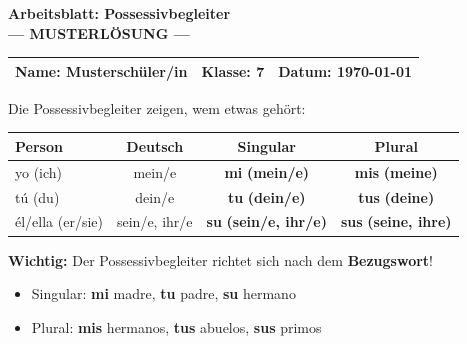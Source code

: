 \documentclass[11pt, a4paper]{article}
\newcommand{\fachfarbe}{spanisch}
\newcommand{\thema}{Possessivbegleiter}
\newcommand{\klasse}{7}
\newcommand{\datum}{\today}
\newcommand{\lsg}[1]{\textcolor{loesung}{\textbf{#1}}}
\newcommand{\es}[1]{\textcolor{\fachfarbe}{\textbf{#1}}}
\begin{document}

\begin{center}
    {\Large\bfseries\textcolor{\fachfarbe}{Arbeitsblatt: \thema}}\\[0.3em]
    {\large\textcolor{loesung}{\textbf{--- MUSTERLÖSUNG ---}}}
\end{center}

\vspace{5pt}

\noindent
\begin{tabularx}{\textwidth}{|X|X|X|}
\hline
\textbf{Name:} \lsg{Musterschüler/in} &
\textbf{Klasse:} \klasse &
\textbf{Datum:} \datum \\
\hline
\end{tabularx}

\vspace{15pt}


\begin{merkkasten}
Die Possessivbegleiter zeigen, wem etwas gehört:

\vspace{0.5em}

\begin{center}
\begin{tabular}{|l|c|c|c|}
\hline
\textbf{Person} & \textbf{Deutsch} & \textbf{Singular} & \textbf{Plural} \\
\hline
yo (ich) & mein/e & \es{mi} \lsg{(mein/e)} & \es{mis} \lsg{(meine)} \\
\hline
tú (du) & dein/e & \es{tu} \lsg{(dein/e)} & \es{tus} \lsg{(deine)} \\
\hline
él/ella (er/sie) & sein/e, ihr/e & \es{su} \lsg{(sein/e, ihr/e)} & \es{sus} \lsg{(seine, ihre)} \\
\hline
\end{tabular}
\end{center}

\vspace{0.5em}

\textbf{Wichtig:} Der Possessivbegleiter richtet sich nach dem \textbf{Bezugswort}!

\begin{itemize}[leftmargin=2em, itemsep=0pt]
    \item Singular: \es{mi} madre, \es{tu} padre, \es{su} hermano
    \item Plural: \es{mis} hermanos, \es{tus} abuelos, \es{sus} primos
\end{itemize}
\end{merkkasten}
\end{document}
